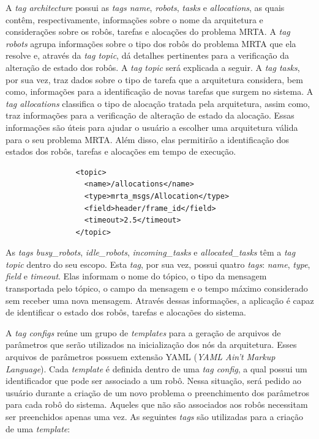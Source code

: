             A \textit{tag architecture} possui as \textit{tags name}, \textit{robots}, \textit{tasks} e \textit{allocations}, as quais contêm, respectivamente, informações sobre o nome da arquitetura e considerações sobre os robôs, tarefas e alocações do problema MRTA. A \textit{tag robots} agrupa informações sobre o tipo dos robôs do problema MRTA que ela resolve e, através da \textit{tag topic}, dá detalhes pertinentes para a verificação da alteração de estado dos robôs. A \textit{tag topic} será explicada a seguir. A \textit{tag tasks}, por sua vez, traz dados sobre o tipo de tarefa que a arquitetura considera, bem como, informações para a identificação de novas tarefas que surgem no sistema. A \textit{tag allocations} classifica o tipo de alocação tratada pela arquitetura, assim como, traz informações para a verificação de alteração de estado da alocação. Essas informações são úteis para ajudar o usuário a escolher uma arquitetura válida para o seu problema MRTA. Além disso, elas permitirão a identificação dos estados dos robôs, tarefas e alocações em tempo de execução.
            
            \begin{lstlisting}
                <topic>
                  <name>/allocations</name>
                  <type>mrta_msgs/Allocation</type>
                  <field>header/frame_id</field>
                  <timeout>2.5</timeout>
                </topic>
            \end{lstlisting}
            
            As \textit{tags busy\_robots}, \textit{idle\_robots}, \textit{incoming\_tasks} e \textit{allocated\_tasks} têm a \textit{tag topic} dentro do seu escopo. Esta \textit{tag}, por sua vez, possui quatro \textit{tags}: \textit{name}, \textit{type}, \textit{field} e \textit{timeout}. Elas informam o nome do tópico, o tipo da mensagem transportada pelo tópico, o campo da mensagem e o tempo máximo considerado sem receber uma nova mensagem. Através dessas informações, a aplicação é capaz de identificar o estado dos robôs, tarefas e alocações do sistema.
            
            A \textit{tag configs} reúne um grupo de \textit{templates} para a geração de arquivos de parâmetros que serão utilizados na inicialização dos nós da arquitetura. Esses arquivos de parâmetros possuem extensão YAML (\textit{YAML Ain't Markup Language}). Cada \textit{template} é definida dentro de uma \textit{tag config}, a qual possui um identificador que pode ser associado a um robô. Nessa situação, será pedido ao usuário durante a criação de um novo problema o preenchimento dos parâmetros para cada robô do sistema. Aqueles que não são associados aos robôs necessitam ser preenchidos apenas uma vez. As seguintes \textit{tags} são utilizadas para a criação de uma \textit{template}:
            

